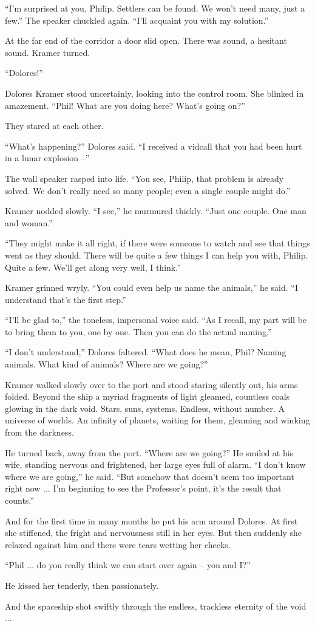 \documentclass[12pt,a5paper]{book}
\begin{document}
“I'm surprised at you, Philip. Settlers can be found. We won't need many, just a few.” The speaker chuckled again. “I'll acquaint you with my solution.”

At the far end of the corridor a door slid open. There was sound, a hesitant sound. Kramer turned.

“Dolores!”

Dolores Kramer stood uncertainly, looking into the control room. She blinked in amazement. “Phil! What are you doing here? What's going on?”

They stared at each other.

“What's happening?” Dolores said. “I received a vidcall that you had been hurt in a lunar explosion –”

The wall speaker rasped into life. “You see, Philip, that problem is already solved. We don't really need so many people; even a single couple might do.”

Kramer nodded slowly. “I see,” he murmured thickly. “Just one couple. One man and woman.”

“They might make it all right, if there were someone to watch and see that things went as they should. There will be quite a few things I can help you with, Philip. Quite a few. We'll get along very well, I think.”

Kramer grinned wryly. “You could even help us name the animals,” he said. “I understand that's the first step.”

“I'll be glad to,” the toneless, impersonal voice said. “As I recall, my part will be to bring them to you, one by one. Then you can do the actual naming.”

“I don't understand,” Dolores faltered. “What does he mean, Phil? Naming animals. What kind of animals? Where are we going?”

Kramer walked slowly over to the port and stood staring silently out, his arms folded. Beyond the ship a myriad fragments of light gleamed, countless coals glowing in the dark void. Stars, suns, systems. Endless, without number. A universe of worlds. An infinity of planets, waiting for them, gleaming and winking from the darkness.

He turned back, away from the port. “Where are we going?” He smiled at his wife, standing nervous and frightened, her large eyes full of alarm. “I don't know where we are going,” he said. “But somehow that doesn't seem too important right now ... I'm beginning to see the Professor's point, it's the result that counts.”

And for the first time in many months he put his arm around Dolores. At first she stiffened, the fright and nervousness still in her eyes. But then suddenly she relaxed against him and there were tears wetting her cheeks.

“Phil ... do you really think we can start over again – you and I?”

He kissed her tenderly, then passionately.

And the spaceship shot swiftly through the endless, trackless eternity of the void ...
\end{document}
